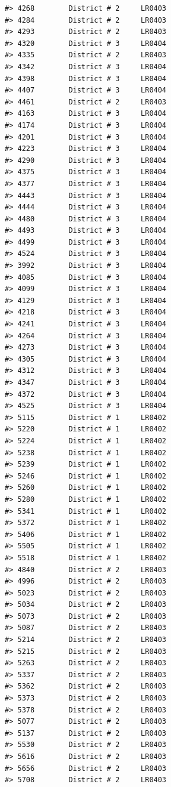 \documentclass[12pt,a4paper]{book}
\theoremstyle{definition}
\theoremstyle{definition}
\theoremstyle{definition}
\theoremstyle{remark}
\begin{document}
\begin{verbatim}
#> 4268        District # 2     LR0403
#> 4284        District # 2     LR0403
#> 4293        District # 2     LR0403
#> 4320        District # 3     LR0404
#> 4335        District # 2     LR0403
#> 4342        District # 3     LR0404
#> 4398        District # 3     LR0404
#> 4407        District # 3     LR0404
#> 4461        District # 2     LR0403
#> 4163        District # 3     LR0404
#> 4174        District # 3     LR0404
#> 4201        District # 3     LR0404
#> 4223        District # 3     LR0404
#> 4290        District # 3     LR0404
#> 4375        District # 3     LR0404
#> 4377        District # 3     LR0404
#> 4443        District # 3     LR0404
#> 4444        District # 3     LR0404
#> 4480        District # 3     LR0404
#> 4493        District # 3     LR0404
#> 4499        District # 3     LR0404
#> 4524        District # 3     LR0404
#> 3992        District # 3     LR0404
#> 4085        District # 3     LR0404
#> 4099        District # 3     LR0404
#> 4129        District # 3     LR0404
#> 4218        District # 3     LR0404
#> 4241        District # 3     LR0404
#> 4264        District # 3     LR0404
#> 4273        District # 3     LR0404
#> 4305        District # 3     LR0404
#> 4312        District # 3     LR0404
#> 4347        District # 3     LR0404
#> 4372        District # 3     LR0404
#> 4525        District # 3     LR0404
#> 5115        District # 1     LR0402
#> 5220        District # 1     LR0402
#> 5224        District # 1     LR0402
#> 5238        District # 1     LR0402
#> 5239        District # 1     LR0402
#> 5246        District # 1     LR0402
#> 5260        District # 1     LR0402
#> 5280        District # 1     LR0402
#> 5341        District # 1     LR0402
#> 5372        District # 1     LR0402
#> 5406        District # 1     LR0402
#> 5505        District # 1     LR0402
#> 5518        District # 1     LR0402
#> 4840        District # 2     LR0403
#> 4996        District # 2     LR0403
#> 5023        District # 2     LR0403
#> 5034        District # 2     LR0403
#> 5073        District # 2     LR0403
#> 5087        District # 2     LR0403
#> 5214        District # 2     LR0403
#> 5215        District # 2     LR0403
#> 5263        District # 2     LR0403
#> 5337        District # 2     LR0403
#> 5362        District # 2     LR0403
#> 5373        District # 2     LR0403
#> 5378        District # 2     LR0403
#> 5077        District # 2     LR0403
#> 5137        District # 2     LR0403
#> 5530        District # 2     LR0403
#> 5616        District # 2     LR0403
#> 5656        District # 2     LR0403
#> 5708        District # 2     LR0403

\end{verbatim}
\end{document}
